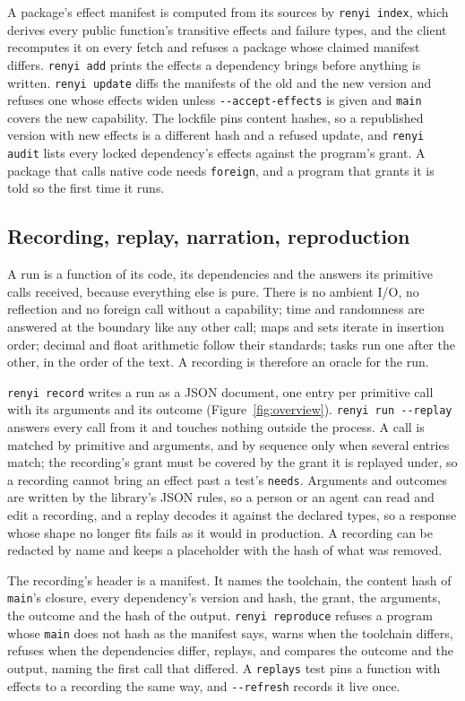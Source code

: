 \documentclass[11pt]{article}
\begin{document}
A package's effect manifest is computed from its sources by
\texttt{renyi index}, which derives every public function's transitive
effects and failure types, and the client recomputes it on every fetch
and refuses a package whose claimed manifest differs. \texttt{renyi add}
prints the effects a dependency brings before anything is written.
\texttt{renyi update} diffs the manifests of the old and the new version
and refuses one whose effects widen unless \texttt{-{}-accept-effects}
is given and \texttt{main} covers the new capability. The lockfile pins
content hashes, so a republished version with new effects is a different
hash and a refused update, and \texttt{renyi audit} lists every locked
dependency's effects against the program's grant. A package that calls
native code needs \texttt{foreign}, and a program that grants it is told
so the first time it runs.

\subsection{Recording, replay, narration, reproduction}
\label{sec:recording}

A run is a function of its code, its dependencies and the answers its
primitive calls received, because everything else is pure. There is no
ambient I/O, no reflection and no foreign call without a capability;
time and randomness are answered at the boundary like any other call;
maps and sets iterate in insertion order; decimal and float arithmetic
follow their standards; tasks run one after the other, in the order of
the text. A recording is therefore an oracle for the run.

\texttt{renyi record} writes a run as a JSON document, one entry per
primitive call with its arguments and its outcome
(Figure~\ref{fig:overview}). \texttt{renyi run -{}-replay} answers every
call from it and touches nothing outside the process. A call is matched
by primitive and arguments, and by sequence only when several entries
match; the recording's grant must be covered by the grant it is
replayed under, so a recording cannot bring an effect past a test's
\texttt{needs}. Arguments and outcomes are written by the library's JSON
rules, so a person or an agent can read and edit a recording, and a
replay decodes it against the declared types, so a response whose shape
no longer fits fails as it would in production. A recording can be
redacted by name and keeps a placeholder with the hash of what was
removed.

The recording's header is a manifest. It names the toolchain, the
content hash of \texttt{main}'s closure, every dependency's version and
hash, the grant, the arguments, the outcome and the hash of the output.
\texttt{renyi reproduce} refuses a program whose \texttt{main} does not
hash as the manifest says, warns when the toolchain differs, refuses
when the dependencies differ, replays, and compares the outcome and the
output, naming the first call that differed. A \texttt{replays} test
pins a function with effects to a recording the same way, and
\texttt{-{}-refresh} records it live once.
\end{document}
